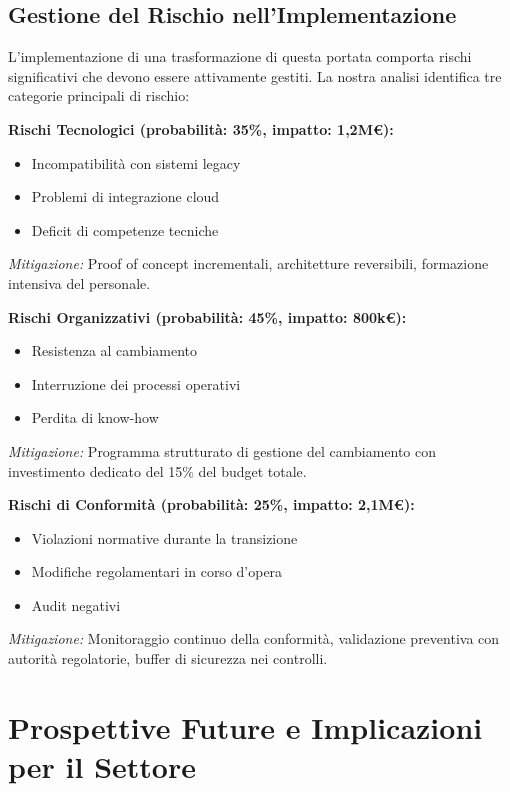 \subsection{\texorpdfstring{Gestione del Rischio nell'Implementazione}{5.4.2 - Gestione del Rischio nell'Implementazione}}
\label{subsec:5.4.2}

L'implementazione di una trasformazione di questa portata comporta rischi significativi che devono essere attivamente gestiti. La nostra analisi identifica tre categorie principali di rischio:

\textbf{Rischi Tecnologici (probabilità: 35\%, impatto: 1,2M€):}
\begin{itemize}
\item Incompatibilità con sistemi legacy
\item Problemi di integrazione cloud
\item Deficit di competenze tecniche
\end{itemize}

\textit{Mitigazione:} Proof of concept incrementali, architetture reversibili, formazione intensiva del personale.

\textbf{Rischi Organizzativi (probabilità: 45\%, impatto: 800k€):}
\begin{itemize}
\item Resistenza al cambiamento
\item Interruzione dei processi operativi
\item Perdita di know-how
\end{itemize}

\textit{Mitigazione:} Programma strutturato di gestione del cambiamento con investimento dedicato del 15\% del budget totale.

\textbf{Rischi di Conformità (probabilità: 25\%, impatto: 2,1M€):}
\begin{itemize}
\item Violazioni normative durante la transizione
\item Modifiche regolamentari in corso d'opera
\item Audit negativi
\end{itemize}

\textit{Mitigazione:} Monitoraggio continuo della conformità, validazione preventiva con autorità regolatorie, buffer di sicurezza nei controlli.

\section{\texorpdfstring{Prospettive Future e Implicazioni per il Settore}{5.5 - Prospettive Future e Implicazioni per il Settore}}
\label{sec:5.5}

